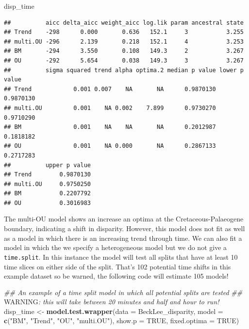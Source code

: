 \documentclass[]{book}
\newenvironment{Shaded}{\begin{snugshade}}{\end{snugshade}}
\newcommand{\AlertTok}[1]{\textcolor[rgb]{0.94,0.16,0.16}{#1}}
\newcommand{\CommentTok}[1]{\textcolor[rgb]{0.56,0.35,0.01}{\textit{#1}}}
\newcommand{\DataTypeTok}[1]{\textcolor[rgb]{0.13,0.29,0.53}{#1}}
\newcommand{\KeywordTok}[1]{\textcolor[rgb]{0.13,0.29,0.53}{\textbf{#1}}}
\newcommand{\NormalTok}[1]{#1}
\newcommand{\OtherTok}[1]{\textcolor[rgb]{0.56,0.35,0.01}{#1}}
\newcommand{\StringTok}[1]{\textcolor[rgb]{0.31,0.60,0.02}{#1}}
\begin{document}
\begin{Shaded}
\begin{Highlighting}[]
\NormalTok{disp_time}
\end{Highlighting}
\end{Shaded}

\begin{verbatim}
##          aicc delta_aicc weight_aicc log.lik param ancestral state
## Trend    -298      0.000       0.636   152.1     3           3.255
## multi.OU -296      2.139       0.218   152.1     4           3.253
## BM       -294      3.550       0.108   149.3     2           3.267
## OU       -292      5.654       0.038   149.3     3           3.267
##          sigma squared trend alpha optima.2 median p value lower p value
## Trend            0.001 0.007    NA       NA      0.9870130     0.9870130
## multi.OU         0.001    NA 0.002    7.899      0.9730270     0.9710290
## BM               0.001    NA    NA       NA      0.2012987     0.1818182
## OU               0.001    NA 0.000       NA      0.2867133     0.2717283
##          upper p value
## Trend        0.9870130
## multi.OU     0.9750250
## BM           0.2207792
## OU           0.3016983
\end{verbatim}

The multi-OU model shows an increase an optima at the Cretaceous-Palaeogene boundary, indicating a shift in disparity.
However, this model does not fit as well as a model in which there is an increasing trend through time.
We can also fit a model in which the we specify a heterogeneous model but we do not give a \texttt{time.split}.
In this instance the model will test all splits that have at least 10 time slices on either side of the split.
That's 102 potential time shifts in this example dataset so be warned, the following code will estimate 105 models!

\begin{Shaded}
\begin{Highlighting}[]
\CommentTok{## An example of a time split model in which all potential splits are tested}
\CommentTok{## }\AlertTok{WARNING}\CommentTok{: this will take between 20 minutes and half and hour to run!}
\NormalTok{disp_time <-}\StringTok{ }\KeywordTok{model.test.wrapper}\NormalTok{(}\DataTypeTok{data =}\NormalTok{ BeckLee_disparity,}
                        \DataTypeTok{model =} \KeywordTok{c}\NormalTok{(}\StringTok{"BM"}\NormalTok{, }\StringTok{"Trend"}\NormalTok{, }\StringTok{"OU"}\NormalTok{, }\StringTok{"multi.OU"}\NormalTok{),}
                                \DataTypeTok{show.p =} \OtherTok{TRUE}\NormalTok{, }\DataTypeTok{fixed.optima =} \OtherTok{TRUE}\NormalTok{)}
\end{Highlighting}
\end{Shaded}
\end{document}
